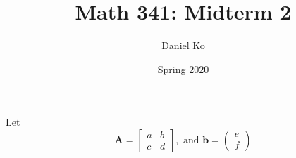 \documentclass[11pt]{scrartcl}
\title{Math 341: Midterm 2}
\author{Daniel Ko}
\date{Spring 2020}
\begin{document}
\maketitle

\section{}
Let
\begin{equation}
	\mathbf{A} = \left [ \begin{array}{cc}
			a & b \\
			c & d
		\end{array} \right ],
	\mbox{ and  } \mathbf{b} = \left ( \begin{array}{c}
			e \\
			f
		\end{array} \right )
\end{equation}
\end{document}
